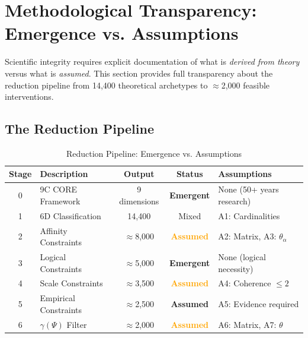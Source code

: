 \section{Methodological Transparency: Emergence vs. Assumptions}
\label{sec:17-transparency}

Scientific integrity requires explicit documentation of what is \textit{derived from theory} versus what is \textit{assumed}. This section provides full transparency about the reduction pipeline from 14,400 theoretical archetypes to $\approx$2,000 feasible interventions.

\subsection{The Reduction Pipeline}

\begin{table}[htbp]
\centering
\caption{Reduction Pipeline: Emergence vs. Assumptions}
\label{tab:17-reduction-pipeline}
\renewcommand{\arraystretch}{1.3}
\small
\begin{tabular}{@{}clccp{4.5cm}@{}}
\toprule
\textbf{Stage} & \textbf{Description} & \textbf{Output} & \textbf{Status} & \textbf{Assumptions} \\
\midrule
0 & 9C CORE Framework & 9 dimensions & \textcolor{green!60!black}{\textbf{Emergent}} & None (50+ years research) \\
1 & 6D Classification & 14,400 & Mixed & A1: Cardinalities \\
2 & Affinity Constraints & $\approx$8,000 & \textcolor{orange}{\textbf{Assumed}} & A2: Matrix, A3: $\theta_\alpha$ \\
3 & Logical Constraints & $\approx$5,000 & \textcolor{green!60!black}{\textbf{Emergent}} & None (logical necessity) \\
4 & Scale Constraints & $\approx$3,500 & \textcolor{orange}{\textbf{Assumed}} & A4: Coherence $\leq 2$ \\
5 & Empirical Constraints & $\approx$2,500 & \textcolor{red!60!black}{\textbf{Assumed}} & A5: Evidence required \\
6 & $\gamma(\Psi)$ Filter & $\approx$2,000 & \textcolor{orange}{\textbf{Assumed}} & A6: Matrix, A7: $\theta$ \\
\bottomrule
\end{tabular}
\end{table}

